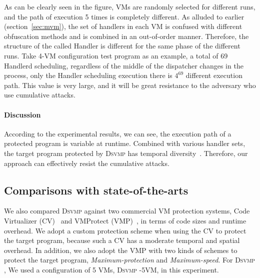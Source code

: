 \documentclass[preprint,12pt,3p]{elsarticle}
\newcommand{\DSVMP}{\textsc{Dsvmp }}
\begin{document}
As can be clearly seen in the figure, VMs are randomly selected for different runs, 
and the path of execution 5 times is completely different. As alluded to earlier (section~\ref{sec:mvm}),
the set of handlers in each VM is confused with different obfuscation methods and is combined in an out-of-order manner. 
Therefore, the structure of the called Handler is different for the same phase of the different runs. 
Take 4-VM configuration test program as an example, a total of 69 Handlerd scheduling, 
regardless of the middle of the dispatcher changes in the process, 
only the Handler scheduling execution there is $4^{69}$ different execution path. 
This value is very large, and it will be great resistance to the adversary who use cumulative attacks.

\paragraph*{Discussion}
According to the experimental results, we can see, the execution path of a protected program is variable at runtime. 
Combined with various handler sets, the target program protected by \DSVMP has temporal diversity~\cite{4collberg}. 
Therefore, our approach can effectively resist the cumulative attacks.






\subsection{Comparisons with state-of-the-arts}
We also compared \DSVMP against two commercial VM protection systems,
Code Virtualizer (CV)~\cite{2CV} and VMProtect (VMP)~\cite{3Vmprotect}, in terms of code sizes and runtime overhead.
We adopt a custom protection scheme when using the CV to protect the target program,
because such a CV has a moderate temporal and spatial overhead.
In addition, we also adopt the VMP with two kinds of schemes to protect the target program,
\emph{Maximum-protection} and \emph{Maximum-speed}.
For \DSVMP, We used a configuration of 5 VMs, \DSVMP-5VM, in this experiment. 
\end{document}
